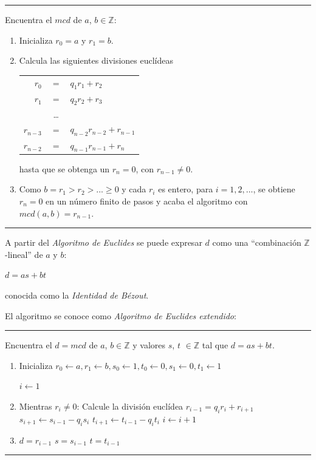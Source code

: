 \hfil


\rule{\textwidth}{1pt}
\begin{algorithm}[Euclides]
	Encuentra el $mcd$ de $a$, $b \in \mathbb{Z}$:
	
	\begin{enumerate}
		\item Inicializa $r_0 = a$ y $r_1 = b$.
		
		\item Calcula las siguientes divisiones euclídeas
		
		\begin{tabular}{rcl}
			$r_0$ & $=$ & $q_1 r_1 + r_2$ \\
			$r_1$ & $=$ & $q_2 r_2 + r_3$ \\
			& \dots & \\
			$r_{n-3}$ & $=$ & $q_{n-2} r_{n-2} + r_{n-1}$ \\
			$r_{n-2}$ & $=$ & $q_{n-1} r_{n-1} + r_{n}$ \\
		\end{tabular}
		
		hasta que se obtenga un $r_n = 0$, con $r_{n-1} \neq 0$.
		
		\item Como $b = r_1 > r_2 > ... \geq 0$ y cada $r_i$ es entero, para $i = 1, 2, ...$, se obtiene $r_n = 0$ en un número finito de pasos y acaba el algoritmo con $mcd(a,b) = r_{n-1}$.
		
	\end{enumerate}
\end{algorithm}
\rule{\textwidth}{1pt}

\hfil

A partir del \textit{Algoritmo de Euclides} se puede expresar $d$ como una ``combinación $\mathbb{Z}$-lineal'' de $a$ y $b$:
\begin{center}
	$d = as + bt$
\end{center}
conocida como la \textit{Identidad de Bézout}.

\hfil

El algoritmo se conoce como \textit{Algoritmo de Euclides extendido}:

\rule{\textwidth}{1pt}
\begin{algorithm}
	Encuentra el $d = mcd$ de $a$, $b \in \mathbb{Z}$ y valores $s$, $t$ $\in \mathbb{Z}$ tal que $d = as + bt$.
	\begin{enumerate}
		\item Inicializa ${\displaystyle r_{0}\gets a,r_{1}\gets b,s_{0}\gets 1,t_{0}\gets 0,s_{1}\gets 0,t_{1}\gets 1}$
		
		$i\gets 1$
		
		\item Mientras $r_i \neq 0$:
		\subitem Calcule la división euclídea $r_{i-1} = q_i r_i + r_{i+1}$
		\subitem ${\displaystyle s_{i+1}\gets s_{i-1}-q_{i}s_{i}}$
		\subitem ${\displaystyle t_{i+1}\gets t_{i-1}-q_{i}t_{i}}$
		\subitem $i \gets i+1$
		
		\item $d = r_{i-1}$	\quad	$s = s_{i-1}$ \quad  $t = t_{i-1}$
	\end{enumerate}
\end{algorithm}
\rule{\textwidth}{1pt}


